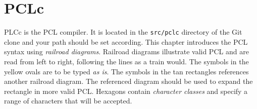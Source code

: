 \newcommand{\DiagramScale}{0.6}
\chapter{PCLc}
PLCc is the PCL compiler. It is located in the \texttt{src/pclc} directory of the Git clone and your path should be set according. This chapter introduces the PCL syntax using \emph{railroad diagrams}. Railroad diagrams illustrate valid PCL and are read from left to right, following the lines as a train would. The symbols in the yellow ovals are to be typed \emph{as is}. The symbols in the tan rectangles references another railroad diagram. The referenced diagram should be used to expand the rectangle in more valid PCL. Hexagons contain \emph{character classes} and specify a range of characters that will be accepted.

